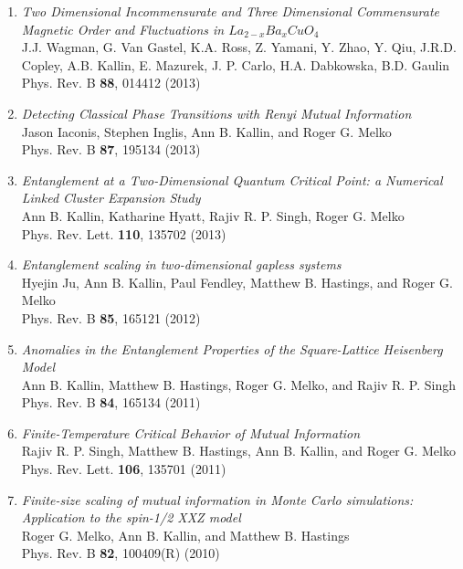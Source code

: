 \documentclass[letterpaper]{article}
\begin{document}
\begin{enumerate}

\item {\it Two Dimensional Incommensurate and Three Dimensional Commensurate Magnetic Order and Fluctuations in $La_{2-x}Ba_{x}CuO_{4}$}\\
J.J. Wagman, G. Van Gastel, K.A. Ross, Z. Yamani, Y. Zhao, Y. Qiu, J.R.D. Copley, A.B. Kallin, E. Mazurek, J. P. Carlo, H.A. Dabkowska, B.D. Gaulin\\
Phys. Rev. B {\bf 88}, 014412 (2013)

\item {\it Detecting Classical Phase Transitions with Renyi Mutual Information}\\
Jason Iaconis, Stephen Inglis, Ann B. Kallin, and Roger G. Melko \\
Phys. Rev. B {\bf 87}, 195134 (2013)

\item {\it Entanglement at a Two-Dimensional Quantum Critical Point: a Numerical Linked Cluster Expansion Study}\\
Ann B. Kallin, Katharine Hyatt, Rajiv R. P. Singh, Roger G. Melko\\
Phys. Rev. Lett. {\bf 110}, 135702 (2013)

\item {\it Entanglement scaling in two-dimensional gapless systems} \\
Hyejin Ju, Ann B. Kallin, Paul Fendley, Matthew B. Hastings, and Roger G. Melko \\
Phys. Rev. B {\bf 85}, 165121 (2012)

\item  {\it Anomalies in the Entanglement Properties of the Square-Lattice Heisenberg Model} \\ %
Ann B. Kallin, Matthew B. Hastings, Roger G. Melko, and Rajiv R. P. Singh \\
Phys. Rev. B {\bf 84}, 165134 (2011) 

\item  {\it Finite-Temperature Critical Behavior of Mutual Information}\\%
Rajiv R. P. Singh, Matthew B. Hastings, Ann B. Kallin, and Roger G. Melko\\ 
Phys. Rev. Lett. {\bf 106}, 135701 (2011)

\item  {\it Finite-size scaling of mutual information in Monte Carlo simulations: Application to the spin-1/2 XXZ model}\\%
Roger G. Melko, Ann B. Kallin, and Matthew B. Hastings  \\
Phys. Rev. B {\bf 82}, 100409(R) (2010) 


\end{enumerate}
\end{document}

